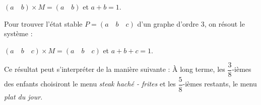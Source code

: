 \begin{corrige}
\begin{enumerate}
{     \par
     $(a\quad b) \times M = (a\quad b)$\: et \: $a + b = 1$.
     \par
     Pour trouver l'état stable $P = (a\quad b\quad c)$ d'un graphe d'ordre 3, on résout le système :
     \par
     $(a\quad b\quad c) \times M = (a\quad b\quad c)$\: et \:$a + b + c = 1$.
}
\medskip
Ce résultat peut s'interpréter de la manière suivante : \og \`A long terme, les $\dfrac{3}{8}$-ièmes des enfants choisiront le menu \textit{steak haché - frites} et les $\dfrac{5}{8}$-ièmes restants, le menu \textit{plat du jour}\fg{}.
\end{enumerate}
\end{corrige}
